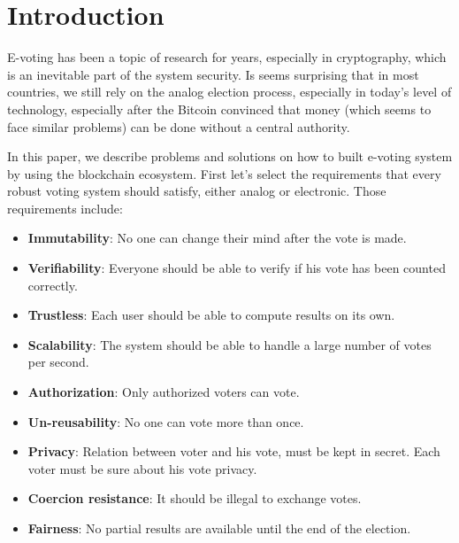 \documentclass[runningheads]{llncs}
\begin{document}
\section{Introduction}
E-voting has been a topic of research for years, especially in cryptography, which is an inevitable part of the system security. Is seems surprising that in most countries, we still rely on the analog election process, especially in today's level of technology, especially after the Bitcoin convinced that money (which seems to face similar problems) can be done without a central authority. 


In this paper, we describe problems and solutions on how to built e-voting system by 
using the  blockchain ecosystem. 
First let's select   the requirements that every robust voting system should satisfy, either analog or electronic. Those requirements include:
\begin{itemize}
\item \textbf{Immutability}: No one can change their mind after the vote is made.
\item \textbf{Verifiability}: Everyone should be able to verify if his vote has been counted correctly.
\item \textbf{Trustless}: Each user should be able to compute results on its own.
\item \textbf{Scalability}: The system should be able to handle a large number of votes per second.
\item \textbf{Authorization}: Only authorized voters can vote.
\item \textbf{Un-reusability}: No one can vote more than once.
\item \textbf{Privacy}: Relation between voter and his vote, must be kept in secret. Each voter must be sure about his vote privacy. 
\item \textbf{Coercion resistance}: It should be illegal to exchange votes.
\item \textbf{Fairness}: No partial results are available until the end of the election.
\end{itemize}
\end{document}
